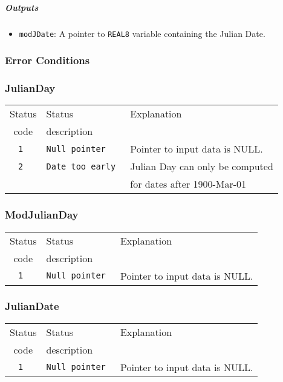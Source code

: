 \subparagraph{Outputs}

\begin{itemize}
    \item \texttt{modJDate}: A pointer to \texttt{REAL8} variable containing
    the Julian Date.
\end{itemize}

\subsubsection{Error Conditions}

\subsubsection{JulianDay}
\begin{tabular}{|c|l|l|}
  \hline
  Status & Status       & Explanation \\
  code   & description  &             \\
  \hline
  \tt 1  & \tt Null pointer & Pointer to input data is NULL. \\
  \tt 2  & \tt Date too early & Julian Day can only be computed \\
         &                    & for dates after 1900-Mar-01 \\
  \hline
\end{tabular}

\subsubsection{ModJulianDay}
\begin{tabular}{|c|l|l|}
  \hline
  Status & Status       & Explanation \\
  code   & description  &             \\
  \hline
  \tt 1  & \tt Null pointer & Pointer to input data is NULL. \\
  \hline
\end{tabular}

\subsubsection{JulianDate}
\begin{tabular}{|c|l|l|}
  \hline
  Status & Status       & Explanation \\
  code   & description  &             \\
  \hline
  \tt 1  & \tt Null pointer & Pointer to input data is NULL. \\
  \hline
\end{tabular}

